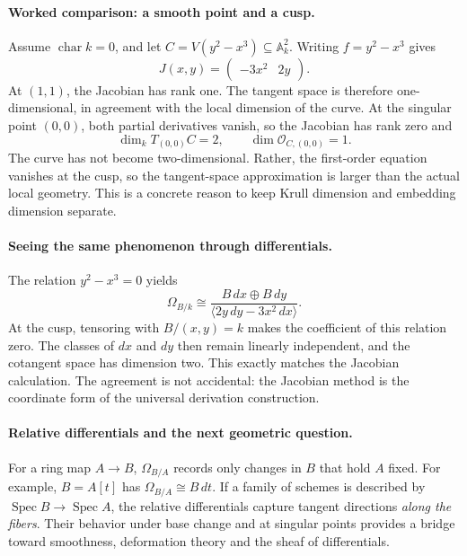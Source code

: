 \paragraph{Worked comparison: a smooth point and a cusp.}
Assume \(\operatorname{char}k=0\), and let
\(C=V(y^2-x^3)\subseteq\mathbb A^2_k\).  Writing
\(f=y^2-x^3\) gives
\[
 J(x,y)=\begin{pmatrix}-3x^2&2y\end{pmatrix}.
\]
At \((1,1)\), the Jacobian has rank one.  The tangent
space is therefore one-dimensional, in agreement with the local
dimension of the curve.  At the singular point \((0,0)\), both
partial derivatives vanish, so the Jacobian has rank zero and
\[
 \dim_k T_{(0,0)}C=2,
 \qquad\dim\mathcal O_{C,(0,0)}=1.
\]
The curve has not become two-dimensional.  Rather, the first-order
equation vanishes at the cusp, so the tangent-space approximation
is larger than the actual local geometry.  This is a concrete
reason to keep Krull dimension and embedding dimension separate.

\paragraph{Seeing the same phenomenon through differentials.}
The relation \(y^2-x^3=0\) yields
\[
 \Omega_{B/k}\cong
 \frac{B\,dx\oplus B\,dy}
 {\langle 2y\,dy-3x^2\,dx\rangle}.
\]
At the cusp, tensoring with \(B/(x,y)=k\) makes the coefficient
of this relation zero.  The classes of \(dx\) and \(dy\) then
remain linearly independent, and the cotangent space has dimension
two.  This exactly matches the Jacobian calculation.  The
agreement is not accidental: the Jacobian method is the
coordinate form of the universal derivation construction.

\paragraph{Relative differentials and the next geometric question.}
For a ring map \(A\to B\), \(\Omega_{B/A}\) records only
changes in \(B\) that hold \(A\) fixed.  For example,
\(B=A[t]\) has \(\Omega_{B/A}\cong B\,dt\).  If a
family of schemes is described by \(\operatorname{Spec}B\to
\operatorname{Spec}A\), the relative differentials capture
tangent directions \emph{along the fibers}.  Their behavior under
base change and at singular points provides a bridge toward
smoothness, deformation theory and the sheaf of differentials.

